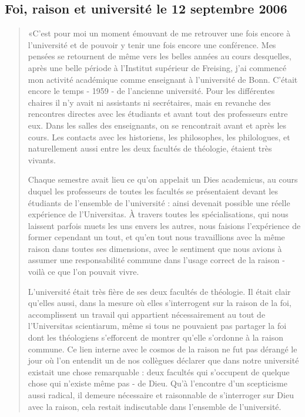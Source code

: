 
\subsection{Foi, raison et université le 12 septembre 2006}
\begin{quote}
    «C'est pour moi un moment émouvant de me retrouver une fois encore à l'université et de pouvoir y tenir une fois encore une conférence. Mes pensées se retournent de même vers les belles années au cours desquelles, après une belle période à l'Institut supérieur de Freising, j'ai commencé mon activité académique comme enseignant à l'université de Bonn. C'était encore le temps - 1959 - de l'ancienne université. Pour les différentes chaires il n'y avait ni assistants ni secrétaires, mais en revanche des rencontres directes avec les étudiants et avant tout des professeurs entre eux. Dans les salles des enseignants, on se rencontrait avant et après les cours. Les contacts avec les historiens, les philosophes, les philologues, et naturellement aussi entre les deux facultés de théologie, étaient très vivants.

Chaque semestre avait lieu ce qu'on appelait un Dies academicus, au cours duquel les professeurs de toutes les facultés se présentaient devant les étudiants de l'ensemble de l'université : ainsi devenait possible une réelle expérience de l'Universitas. À travers toutes les spécialisations, qui nous laissent parfois muets les uns envers les autres, nous faisions l'expérience de former cependant un tout, et qu'en tout nous travaillions avec la même raison dans toutes ses dimensions, avec le sentiment que nous avions à assumer une responsabilité commune dans l'usage correct de la raison - voilà ce que l'on pouvait vivre.

L'université était très fière de ses deux facultés de théologie. Il était clair qu'elles aussi, dans la mesure où elles s'interrogent sur la raison de la foi, accomplissent un travail qui appartient nécessairement au tout de l'Universitas scientiarum, même si tous ne pouvaient pas partager la foi dont les théologiens s'efforcent de montrer qu'elle s'ordonne à la raison commune. Ce lien interne avec le cosmos de la raison ne fut pas dérangé le jour où l'on entendit un de nos collègues déclarer que dans notre université existait une chose remarquable : deux facultés qui s'occupent de quelque chose qui n'existe même pas - de Dieu. Qu'à l'encontre d'un scepticisme aussi radical, il demeure nécessaire et raisonnable de s'interroger sur Dieu avec la raison, cela restait indiscutable dans l'ensemble de l'université.


\end{quote}
